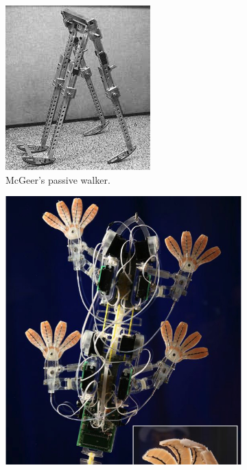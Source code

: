 \begin{figure}[htb]
	\centering
	\begin{subfigure}[t]{0.35\textwidth}
        \includegraphics[width=\textwidth]{figures/passive_walker.jpg}
        \caption{McGeer's passive walker.}
        \label{fig:passive_walker}
    \end{subfigure}
    \begin{subfigure}[t]{0.35\textwidth}
        \includegraphics[width=\textwidth]{figures/Stickybot.jpg}

\end{subfigure}
\end{figure}
